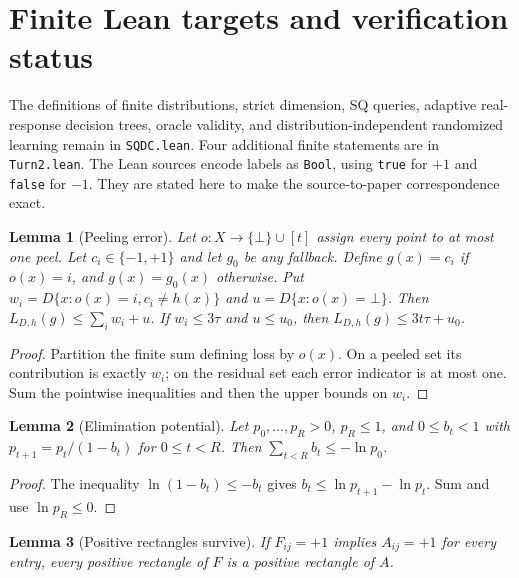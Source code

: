 \documentclass[11pt]{article}
\newtheorem{leanlemma}{Lemma}
\newcommand{\1}{\mathbf 1}
\begin{document}


\section{Finite Lean targets and verification status}\label{app:lean}
The definitions of finite distributions, strict dimension, SQ queries, adaptive real-response decision trees, oracle validity, and distribution-independent randomized learning remain in \texttt{SQDC.lean}. Four additional finite statements are in \texttt{Turn2.lean}. The Lean sources encode labels as \texttt{Bool}, using \texttt{true} for $+1$ and \texttt{false} for $-1$. They are stated here to make the source-to-paper correspondence exact.

\begin{samepage}
\begin{leanlemma}[Peeling error]
Let $o:X\to\{\bot\}\cup[t]$ assign every point to at most one peel. Let $c_i\in\{-1,+1\}$ and let $g_0$ be any fallback. Define $g(x)=c_i$ if $o(x)=i$, and $g(x)=g_0(x)$ otherwise. Put $w_i=D\{x:o(x)=i,c_i\ne h(x)\}$ and $u=D\{x:o(x)=\bot\}$. Then $L_{D,h}(g)\le\sum_iw_i+u$. If $w_i\le3\tau$ and $u\le u_0$, then $L_{D,h}(g)\le3t\tau+u_0$.
\end{leanlemma}
\end{samepage}
\begin{proof}
Partition the finite sum defining loss by $o(x)$. On a peeled set its contribution is exactly $w_i$; on the residual set each error indicator is at most one. Sum the pointwise inequalities and then the upper bounds on $w_i$.
\end{proof}
\begin{samepage}
\begin{leanlemma}[Elimination potential]
Let $p_0,\ldots,p_R>0$, $p_R\le1$, and $0\le b_t<1$ with $p_{t+1}=p_t/(1-b_t)$ for $0\le t<R$. Then $\sum_{t<R}b_t\le-\ln p_0$.
\end{leanlemma}
\end{samepage}
\begin{proof}
The inequality $\ln(1-b_t)\le-b_t$ gives $b_t\le\ln p_{t+1}-\ln p_t$. Sum and use $\ln p_R\le0$.
\end{proof}
\begin{samepage}
\begin{leanlemma}[Positive rectangles survive]
If $F_{ij}=+1$ implies $A_{ij}=+1$ for every entry, every positive rectangle of $F$ is a positive rectangle of $A$.
\end{leanlemma}
\end{samepage}
\end{document}
